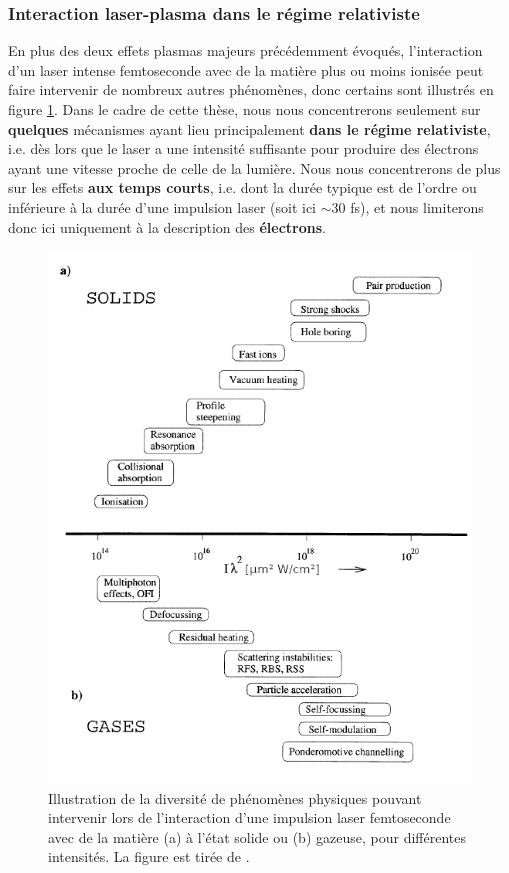 \begin{refsection}
\subsubsection{Interaction laser-plasma dans le régime relativiste}

En plus des deux effets plasmas majeurs précédemment évoqués, l'interaction d'un laser intense femtoseconde avec de la matière plus ou moins ionisée peut faire intervenir de nombreux autres phénomènes, donc certains sont illustrés en figure \ref{fig:2-diversite_laser_fs}. Dans le cadre de cette thèse, nous nous concentrerons seulement sur \textbf{quelques} mécanismes ayant lieu principalement \textbf{dans le régime relativiste}, i.e. dès lors que le laser a une intensité suffisante pour produire des électrons ayant une vitesse proche de celle de la lumière. Nous nous concentrerons de plus sur les effets \textbf{aux temps courts}, i.e. dont la durée typique est de l'ordre ou inférieure à la durée d'une impulsion laser (soit ici $\sim 30$ fs), et nous limiterons donc ici uniquement à la description des \textbf{électrons}. 

\begin{figure}[t]
    \centering
    \includegraphics[width=0.65\linewidth]{2-laser/physics_fs_laser_pulse.png}
    \caption{Illustration de la diversité de phénomènes physiques pouvant intervenir lors de l'interaction d'une impulsion laser femtoseconde avec de la matière (a) à l'état solide ou (b) gazeuse, pour différentes intensités. La figure est tirée de \parencite{gibbon_1996}.}
    \label{fig:2-diversite_laser_fs}
\end{figure}


\end{refsection}
